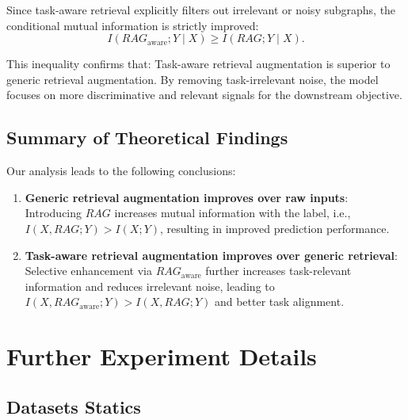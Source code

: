 \documentclass[letterpaper]{article} %
\begin{document}
Since task-aware retrieval explicitly filters out irrelevant or noisy subgraphs, the conditional mutual information is strictly improved:
\begin{equation}
{I(RAG_{\text{aware}}; Y \mid X) \geq I(RAG; Y \mid X)}.
\end{equation}

This inequality confirms that: {Task-aware retrieval augmentation is superior to generic retrieval augmentation}. By removing task-irrelevant noise, the model focuses on more discriminative and relevant signals for the downstream objective.

\subsection*{Summary of Theoretical Findings}

Our analysis leads to the following conclusions:
\begin{enumerate}[leftmargin=*]
    \item \textbf{Generic retrieval augmentation improves over raw inputs}: Introducing $RAG$ increases mutual information with the label, i.e., $I(X, RAG; Y) > I(X; Y)$, resulting in improved prediction performance.
    \item \textbf{Task-aware retrieval augmentation improves over generic retrieval}: Selective enhancement via $RAG_{\text{aware}}$ further increases task-relevant information and reduces irrelevant noise, leading to $I(X, RAG_{\text{aware}}; Y) > I(X, RAG; Y)$ and better task alignment.
\end{enumerate}

\section{Further Experiment Details}
\label{appendix:exp_details}
\subsection{Datasets Statics}
\label{appendix: datasets}
\end{document}
